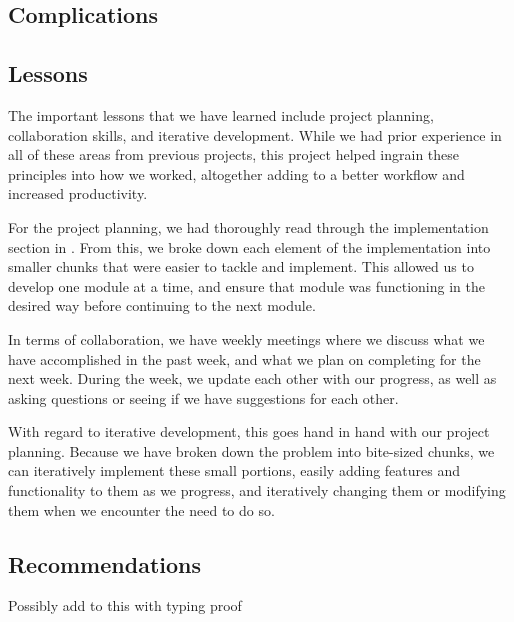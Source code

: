 \documentclass[11pt]{article} %
\begin{document}
\subsection{Complications}



\subsection{Lessons}

The important lessons that we have learned include project planning,
collaboration skills, and iterative development. While we had prior
experience in all of these areas from previous projects, this project
helped ingrain these principles into how we worked, altogether adding to
a better workflow and increased productivity. 

For the project planning, we had thoroughly read through the
implementation section in \cite{shirvanian2d2fa}. From this, we 
broke down each element of the implementation into smaller chunks that
were easier to tackle and implement. This allowed us to develop one
module at a time, and ensure that module was functioning in the desired
way before continuing to the next module. 

In terms of collaboration, we have weekly meetings where we discuss what
we have accomplished in the past week, and what we plan on completing
for the next week. During the week, we update each other with our
progress, as well as asking questions or seeing if we have suggestions
for each other. 

With regard to iterative development, this goes hand in hand with our
project planning. Because we have broken down the problem into
bite-sized chunks, we can iteratively implement these small portions,
easily adding features and functionality to them as we progress, and
iteratively changing them or modifying them when we encounter the need
to do so.

\subsection{Recommendations}


Possibly add to this with typing proof \cite{liuTypingProof}



\end{document}
